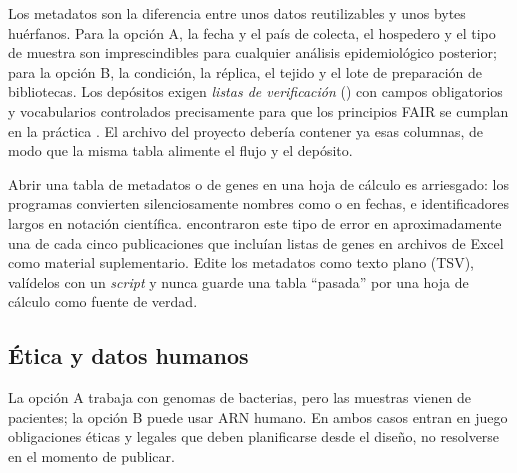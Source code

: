 Los metadatos son la diferencia entre unos datos reutilizables y unos bytes huérfanos. Para la opción A, la fecha y el país de colecta, el hospedero y el tipo de muestra son imprescindibles para cualquier análisis epidemiológico posterior; para la opción B, la condición, la réplica, el tejido y el lote de preparación de bibliotecas. Los depósitos exigen \emph{listas de verificación} () con campos obligatorios y vocabularios controlados precisamente para que los principios FAIR se cumplan en la práctica \parencite{c18-wilkinson2016}. El archivo  del proyecto debería contener ya esas columnas, de modo que la misma tabla alimente el flujo y el depósito.

\begin{cuidado}
Abrir una tabla de metadatos o de genes en una hoja de cálculo es arriesgado: los programas convierten silenciosamente nombres como  o  en fechas, e identificadores largos en notación científica. \textcite{c18-ziemann2016} encontraron este tipo de error en aproximadamente una de cada cinco publicaciones que incluían listas de genes en archivos de Excel como material suplementario. Edite los metadatos como texto plano (TSV), valídelos con un \emph{script} y nunca guarde una tabla ``pasada'' por una hoja de cálculo como fuente de verdad.
\end{cuidado}

\subsection{Ética y datos humanos}

La opción A trabaja con genomas de bacterias, pero las muestras vienen de pacientes; la opción B puede usar ARN humano. En ambos casos entran en juego obligaciones éticas y legales que deben planificarse desde el diseño, no resolverse en el momento de publicar.


